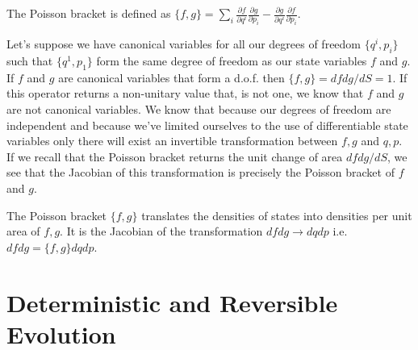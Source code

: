 \documentclass{article}
\begin{document}
\begin{defn}
	The Poisson bracket is defined as $\{f,g\} = \sum_i \frac{\partial f}{\partial q^i}\frac{\partial g}{\partial p_i} - \frac{\partial g}{\partial q^i}\frac{\partial f}{\partial p_i}$.
\end{defn}

	Let's suppose we have canonical variables for all our degrees of freedom $\{q^i,p_i\}$ such that $\{q^1,p_1\}$ form the same degree of freedom as our state variables $f$ and $g$. If $f$ and $g$ are canonical variables that form a d.o.f. then $\{f,g \} = dfdg/dS = 1$. If this operator returns a non-unitary value that, is not one, we know that $f$ and $g$ are not canonical variables. We know that because our degrees of freedom are independent and because we've limited ourselves to the use of differentiable state variables only there will exist an invertible transformation between $f,g$ and $q,p$. If we recall that the Poisson bracket returns the unit change of area $dfdg/dS$, we see that the Jacobian of this transformation is precisely the Poisson bracket of $f$ and $g$.

\begin{prop}
	The Poisson bracket $\{f, g\}$ translates the densities of states into densities per unit area of $f, g$. It is the Jacobian of the transformation $dfdg \rightarrow dqdp$ i.e. $dfdg = \{f,g\}dqdp$.
\end{prop}
	
\section{Deterministic and Reversible Evolution}
\end{document}

